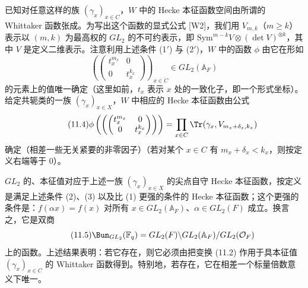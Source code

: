 已知对任意这样的族 $(\gamma_x)_{x\in C}$，$W$ 中的 Hecke 本征函数空间由所谓的 Whittaker 函数张成。为写出这个函数的显式公式 [W2]，我们用 $V_{m,k}$（$m\geq k$）表示以 $(m,k)$ 为最高权的 $GL_2$ 的不可约表示，即 $\mathrm{Sym}^{m-k}V\otimes(\det V)^{\otimes k}$，其中 $V$ 是定义二维表示。注意利用上述条件 (1$'$) 与 (2$'$)，$W$ 中的函数 $\phi$ 由它在形如
\begin{equation}\tag{11.3}
\left(\begin{pmatrix}t_x^{m_x}&0\\ 0&t_x^{k_x}\end{pmatrix}\right)_{x\in C}\in GL_2(\mathbb{A}_F)
\end{equation}
的元素上的值唯一确定（这里如前，$t_x$ 表示 $x$ 处的一致化子，即一个形式坐标）。给定共轭类的一族 $(\gamma_x)_{x\in X}$，$W$ 中相应的 Hecke 本征函数由公式
\begin{equation}\tag{11.4}
\phi\left(\left(\begin{pmatrix}t_x^{m_x}&0\\ 0&t_x^{k_x}\end{pmatrix}\right)\right)=\prod_{x\in C}\Tr(\gamma_x,V_{m_x+\delta_x,k_x})
\end{equation}
确定（相差一些无关紧要的非零因子）（若对某个 $x\in C$ 有 $m_x+\delta_x<k_x$，则按定义右端等于 0）。

$GL_2$ 的、本征值对应于上述一族 $(\gamma_x)_{x\in X}$ 的尖点自守 Hecke 本征函数，按定义是满足上述条件 (2)、(3) 以及比 (1) 更强的条件的 Hecke 本征函数；这个更强的条件是：$f(\alpha x)=f(x)$ 对所有 $x\in GL_2(\mathbb{A}_F)$、$\alpha\in GL_2(F)$ 成立。换言之，它是双商
\begin{equation}\tag{11.5}
\Bun_{GL_2}(\mathbb{F}_q) = GL_2(F)\backslash GL_2(\mathbb{A}_F)/GL_2(\mathcal{O}_F)
\end{equation}
上的函数。上述结果表明：若它存在，则它必须由把变换 (11.2) 作用于具本征值 $(\gamma_x)_{x\in C}$ 的 Whittaker 函数得到。特别地，若存在，它在相差一个标量倍数意义下唯一。

